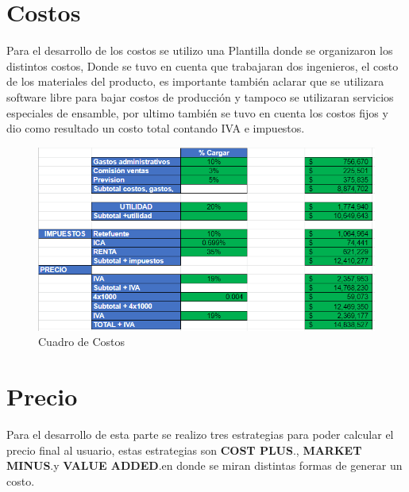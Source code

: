 \documentclass[conference,compsoc,onecolumn]{IEEEtran}
\begin{document}
\section{Costos}
Para el desarrollo de los costos se utilizo una Plantilla donde se organizaron los distintos costos, Donde se tuvo en cuenta que trabajaran dos ingenieros, el costo de los materiales del producto, es importante también aclarar que se utilizara software libre para bajar costos de producción y tampoco se utilizaran servicios especiales de ensamble, por ultimo también se tuvo en cuenta los costos fijos y dio como resultado un costo total contando IVA e impuestos.

\begin{figure}[H]
    \centering
    \includegraphics[scale = 0.9]{imagenes/costos.PNG}
    \caption{Cuadro de Costos}
    \label{fig:my_label}
\end{figure}


\section{Precio}
Para el desarrollo de esta parte se realizo tres estrategias para poder calcular el precio final al usuario, estas estrategias son \textbf{COST PLUS}.\bigskip , \textbf{MARKET MINUS}.\bigskip y \textbf{VALUE ADDED}.\bigskip en donde se miran distintas formas de generar un costo.
\end{document}
